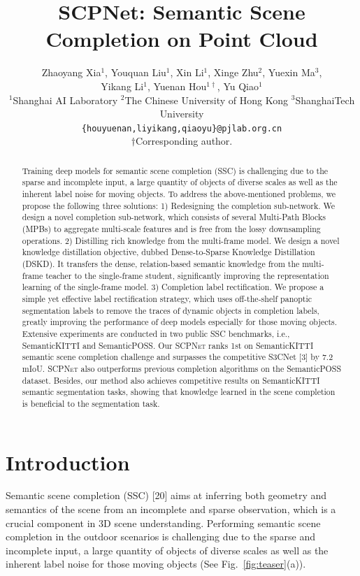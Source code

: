 \documentclass[10pt,twocolumn,letterpaper]{article}
\title{SCPNet: Semantic Scene Completion on Point Cloud}
\author{
  Zhaoyang Xia$^{1}$,\quad
  Youquan Liu$^{1}$,\quad
  Xin Li$^{1}$,\quad
  Xinge Zhu$^{2}$,\quad
  Yuexin Ma$^{3}$,\\
  Yikang Li$^{1}$,\quad
  Yuenan Hou$^{1\dagger}$,\quad
  Yu Qiao$^{1}$\\[4pt]
  $^{1}$Shanghai AI Laboratory\quad
  $^{2}$The Chinese University of Hong Kong\quad
  $^{3}$ShanghaiTech University\\
  \texttt{\{houyuenan,liyikang,qiaoyu\}@pjlab.org.cn}\\[2pt]
  \small{$\dagger$Corresponding author.}
}
\date{}
\newcommand{\methodname}{\textsc{SCPNet}}
\begin{document}
\maketitle

\begin{abstract}
Training deep models for semantic scene completion (SSC) is challenging due to the sparse and incomplete input, a large quantity of objects of diverse scales as well as the inherent label noise for moving objects.
To address the above-mentioned problems, we propose the following three solutions:
1) Redesigning the completion sub-network. We design a novel completion sub-network, which consists of several Multi-Path Blocks (MPBs) to aggregate multi-scale features and is free from the lossy downsampling operations.
2) Distilling rich knowledge from the multi-frame model. We design a novel knowledge distillation objective, dubbed Dense-to-Sparse Knowledge Distillation (DSKD). It transfers the dense, relation-based semantic knowledge from the multi-frame teacher to the single-frame student, significantly improving the representation learning of the single-frame model.
3) Completion label rectification. We propose a simple yet effective label rectification strategy, which uses off-the-shelf panoptic segmentation labels to remove the traces of dynamic objects in completion labels, greatly improving the performance of deep models especially for those moving objects.
Extensive experiments are conducted in two public SSC benchmarks, i.e., SemanticKITTI and SemanticPOSS. Our \methodname{} ranks 1st on SemanticKITTI semantic scene completion challenge and surpasses the competitive S3CNet [3] by 7.2 mIoU. \methodname{} also outperforms previous completion algorithms on the SemanticPOSS dataset. Besides, our method also achieves competitive results on SemanticKITTI semantic segmentation tasks, showing that knowledge learned in the scene completion is beneficial to the segmentation task.
\end{abstract}


\section{Introduction}

Semantic scene completion (SSC) [20] aims at inferring both geometry and semantics of the scene from an incomplete and sparse observation, which is a crucial component in 3D scene understanding. Performing semantic scene completion in the outdoor scenarios is challenging due to the sparse and incomplete input, a large quantity of objects of diverse scales as well as the inherent label noise for those moving objects (See Fig.~\ref{fig:teaser}(a)).
\end{document}
